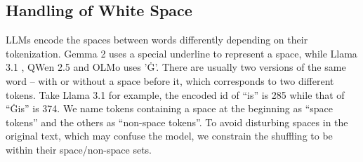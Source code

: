 \documentclass[11pt]{article}
\newcommand{\gemma}{Gemma 2 }
\newcommand{\llama}{Llama 3.1 }
\newcommand{\qwen}{QWen 2.5 }
\newcommand{\olmo}{OLMo }
\begin{document}
\subsection{Handling of White Space}
\label{appendix:space}
LLMs encode the spaces between words differently depending on their tokenization.
\gemma uses a special underline to represent a space, while \llama, \qwen and \olmo uses 'Ġ'.
There are usually two versions of the same word -- with or without a space before it, which corresponds to two different tokens.
Take \llama for example, the encoded id of ``is'' is 285 while that of ``Ġis'' is 374.
We name tokens containing a space at the beginning as ``space tokens'' and the others as ``non-space tokens''.
To avoid disturbing spaces in the original text, which may confuse the model, we constrain the shuffling to be within their space/non-space sets.






\newcommand{\cmark}{\multirow{1}{*}{\textcolor{DarkGreen}{\ding{51}}}}
\newcommand{\xmark}{\multirow{1}{*}{\textcolor{red}{\ding{55}}}}
\end{document}
